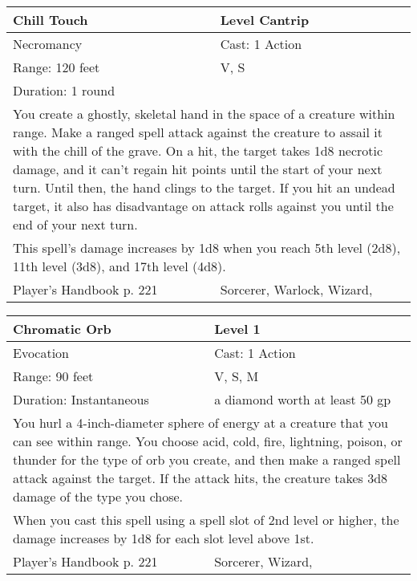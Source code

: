 \documentclass[11pt]{report}
\begin{document}
\begin{table}[H]
	\begin{tabular}{||p{6cm}|p{6cm}||}
		\hline\hline
		\bf{Chill Touch} & Level Cantrip\\ \hline
		Necromancy & Cast: 1 Action\\ \hline
		Range: 120 feet & V, S\\ \hline
		Duration: 1 round & \\ \hline
		\multicolumn{2}{||p{12cm}||}{You create a ghostly, skeletal hand in the space of a creature within range. 
Make a ranged spell attack against the creature to assail it with the chill of the grave. On a hit, the target takes 1d8 necrotic damage, and it can’t regain hit points until the start of your next turn. Until then, the hand clings to the target. If you hit an undead target, it also has disadvantage on attack rolls against you until the end of your next turn.}\\ \hline
		\multicolumn{2}{||p{12cm}||}{This spell’s damage increases by 1d8 when you reach 5th level (2d8), 11th level (3d8), and 17th level (4d8).}\\ \hline
Player's Handbook p. 221 & Sorcerer, Warlock, Wizard, \\ \hline\hline
	\end{tabular}
\end{table}

\begin{table}[H]
	\begin{tabular}{||p{6cm}|p{6cm}||}
		\hline\hline
		\bf{Chromatic Orb} & Level 1\\ \hline
		Evocation & Cast: 1 Action\\ \hline
		Range: 90 feet & V, S, M \\ \hline
		Duration: Instantaneous & a diamond worth at least 50 gp\\ \hline
		\multicolumn{2}{||p{12cm}||}{You hurl a 4-inch-diameter sphere of energy at a creature that you can see within range. You choose acid, cold, fire, lightning, poison, or thunder for the type of orb you create, and then make a ranged spell attack against the target. If the attack hits, the creature takes 3d8 damage of the type you chose.}\\ \hline
		\multicolumn{2}{||p{12cm}||}{When you cast this spell using a spell slot of 2nd level or higher, the damage increases by 1d8 for each slot level above 1st.}\\ \hline
Player's Handbook p. 221 & Sorcerer, Wizard, \\ \hline\hline
	\end{tabular}
\end{table}
\end{document}
